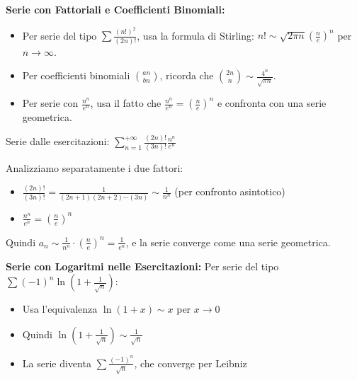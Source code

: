 \begin{info}
\textbf{Serie con Fattoriali e Coefficienti Binomiali:}
\begin{itemize}
    \item Per serie del tipo $\sum \frac{(n!)^2}{(2n)!}$, usa la formula di Stirling: $n! \sim \sqrt{2\pi n}\left(\frac{n}{e}\right)^n$ per $n \to \infty$.
    \item Per coefficienti binomiali $\binom{an}{bn}$, ricorda che $\binom{2n}{n} \sim \frac{4^n}{\sqrt{\pi n}}$.
    \item Per serie con $\frac{n^n}{e^n}$, usa il fatto che $\frac{n^n}{e^n} = \left(\frac{n}{e}\right)^n$ e confronta con una serie geometrica.
\end{itemize}
\end{info}

\begin{esempio}
Serie dalle esercitazioni: $\sum_{n=1}^{+\infty}\frac{(2n)!}{(3n)!}\frac{n^n}{e^n}$

Analizziamo separatamente i due fattori:
\begin{itemize}
    \item $\frac{(2n)!}{(3n)!} = \frac{1}{(2n+1)(2n+2)\cdots(3n)} \sim \frac{1}{n^n}$ (per confronto asintotico)
    \item $\frac{n^n}{e^n} = \left(\frac{n}{e}\right)^n$
\end{itemize}
Quindi $a_n \sim \frac{1}{n^n} \cdot \left(\frac{n}{e}\right)^n = \frac{1}{e^n}$, e la serie converge come una serie geometrica.
\end{esempio}

\begin{info}
\textbf{Serie con Logaritmi nelle Esercitazioni:}
Per serie del tipo $\sum (-1)^n \ln\left(1+\frac{1}{\sqrt{n}}\right)$:
\begin{itemize}
    \item Usa l'equivalenza $\ln(1+x) \sim x$ per $x \to 0$
    \item Quindi $\ln\left(1+\frac{1}{\sqrt{n}}\right) \sim \frac{1}{\sqrt{n}}$
    \item La serie diventa $\sum \frac{(-1)^n}{\sqrt{n}}$, che converge per Leibniz
\end{itemize}
\end{info}


